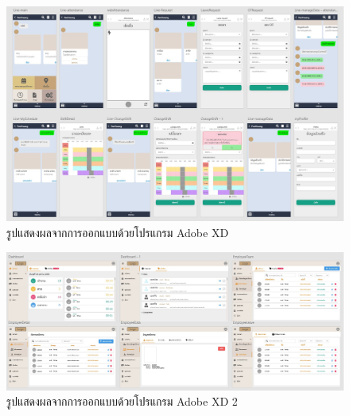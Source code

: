 \begin{figure}
  \begin{center}
    \includegraphics[width=\linewidth]{./images/design_xd.jpg}
  \end{center}
  \caption[รูปแสดงผลจากการออกแบบด้วยโปรแกรม Adobe XD]{รูปแสดงผลจากการออกแบบด้วยโปรแกรม Adobe XD} 
  
\end{figure}

\begin{figure}
  \begin{center}
    \includegraphics[width=\linewidth]{./images/design_xd2.jpg}
  \end{center}
  \caption[รูปแสดงผลจากการออกแบบด้วยโปรแกรม Adobe XD 2]{รูปแสดงผลจากการออกแบบด้วยโปรแกรม Adobe XD 2} 
  
\end{figure}




